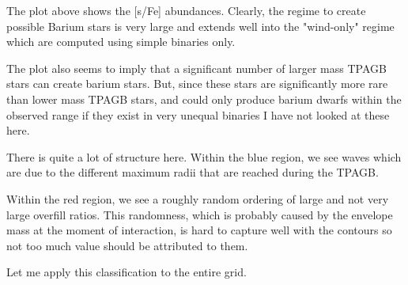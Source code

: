 \documentclass[a4paper,10pt]{article}
\begin{document}
\begin{figure}[ht]
	\centering
\end{figure}

The plot above shows the [s/Fe] abundances.
Clearly, the regime to create possible Barium stars
is very large and extends well into the "wind-only" regime which are computed using simple binaries
only.

The plot also seems to imply that a significant number of larger mass TPAGB stars can
create barium stars.
But, since these stars are significantly more rare than lower mass TPAGB stars,
and could only produce barium dwarfs within the observed range if they exist in very unequal binaries
I have not looked at these here.

\begin{figure}[ht]
	\centering
\end{figure}

There is quite a lot of structure here.
Within the blue region, we see waves which
are due to the different maximum radii that are reached during the TPAGB.

Within the red region, we see a roughly random ordering of large and not very large overfill ratios.
This randomness, which is probably caused by the envelope mass at the moment of interaction, is hard to
capture well with the contours so not too much value should be attributed to them.

\begin{figure}[ht]
	\centering
\end{figure}

\begin{figure}[ht]
	\centering
\end{figure}

Let me apply this classification to the entire grid.

\begin{figure}[ht]
	\centering
\end{figure}
\end{document}
